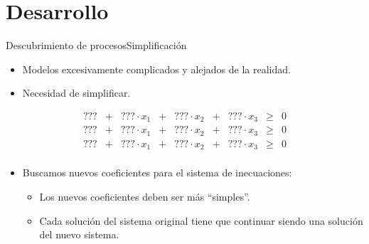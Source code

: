 \documentclass[spanish,pdf]{beamer}
\begin{document}
\section{Desarrollo}

\begin{frame}{Descubrimiento de procesos}{Simplificación}
  \begin{minipage}[c][0.2\textheight][c]{\linewidth}
  \begin{itemize}
      \item<1-> Modelos excesivamente complicados y alejados de la realidad.
      \item<1->Necesidad de simplificar. 
  \end{itemize}
  \end{minipage}
\pause[2]
  \begin{minipage}[c][0.2\textheight][c]{\linewidth}
    $$\begin{array}{rcccccccl}
        ??? & + & ??? \cdot x_1 & + & ??? \cdot x_2 & + & ??? \cdot x_3 & \ge & 0 \\
        ??? & + & ??? \cdot x_1 & + & ??? \cdot x_2 & + & ??? \cdot x_3 & \ge & 0 \\
        ??? & + & ??? \cdot x_1 & + & ??? \cdot x_2 & + & ??? \cdot x_3 & \ge & 0 \\
    \end{array}$$
  \end{minipage}
  \begin{itemize}
      \item<3-> Buscamos nuevos coeficientes para el sistema de inecuaciones: 
        \begin{itemize}
            \item Los nuevos coeficientes deben ser más ``simples''.
            \item Cada solución del sistema original tiene que continuar siendo
                una solución del nuevo sistema.
        \end{itemize}
  \end{itemize}
\end{frame}
\end{document}
